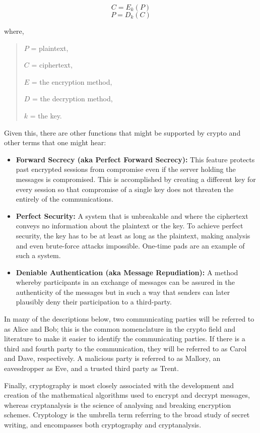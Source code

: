 \documentclass[british]{article}
\begin{document}
\[
C=E_{k}(P)
\]
\[
P=D_{k}(C)
\]

where, 
\begin{verse}
$P$ = plaintext,

$C$ = ciphertext,

$E$ = the encryption method,

$D$ = the decryption method,

$k$ = the key. 
\end{verse}
Given this, there are other functions that might be supported by crypto
and other terms that one might hear: 
\begin{itemize}
\item \textbf{Forward Secrecy (aka Perfect Forward Secrecy):} This feature
protects past encrypted sessions from compromise even if the server
holding the messages is compromised. This is accomplished by creating
a different key for every session so that compromise of a single key
does not threaten the entirely of the communications. 
\item \textbf{Perfect Security: }A system that is unbreakable and where
the ciphertext conveys no information about the plaintext or the key.
To achieve perfect security, the key has to be at least as long as
the plaintext, making analysis and even brute-force attacks impossible.
One-time pads are an example of such a system. 
\item \textbf{Deniable Authentication (aka Message Repudiation): }A method
whereby participants in an exchange of messages can be assured in
the authenticity of the messages but in such a way that senders can
later plausibly deny their participation to a third-party. 
\end{itemize}
In many of the descriptions below, two communicating parties will
be referred to as Alice and Bob; this is the common nomenclature in
the crypto field and literature to make it easier to identify the
communicating parties. If there is a third and fourth party to the
communication, they will be referred to as Carol and Dave, respectively.
A malicious party is referred to as Mallory, an eavesdropper as Eve,
and a trusted third party as Trent.

Finally, cryptography is most closely associated with the development
and creation of the mathematical algorithms used to encrypt and decrypt
messages, whereas cryptanalysis is the science of analysing and breaking
encryption schemes. Cryptology is the umbrella term referring to the
broad study of secret writing, and encompasses both cryptography and
cryptanalysis.
\end{document}

